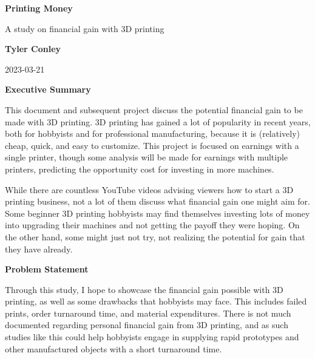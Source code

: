 \documentclass[11pt]{article}
\begin{document}
\begin{titlepage}
    \begin{center}
        \vspace*{1in}

        \Huge
        \textbf{Printing Money}

        \vspace{0.25in}
        \LARGE
        A study on financial gain with 3D printing

        \vspace{1 in}

        \textbf{Tyler Conley}

        \vspace{0.5in}
        2023-03-21

        \vfill
    \end{center}
\end{titlepage}



\begin{center}
    \LARGE
    \textbf{Executive Summary}
\end{center}

This document and subsequent project discuss the potential financial gain to be made with 3D printing. 3D printing has gained a lot of popularity in recent years, both for hobbyists
and for professional manufacturing, because it is (relatively) cheap, quick, and easy to customize. This project is focused on earnings with a single printer, though some analysis will
be made for earnings with multiple printers, predicting the opportunity cost for investing in more machines.

While there are countless YouTube videos advising viewers how to start a 3D printing business, not a lot of them discuss what financial gain one might aim for. Some beginner 3D printing
hobbyists may find themselves investing lots of money into upgrading their machines and not getting the payoff they were hoping. On the other hand, some might just not try, not realizing
the potential for gain that they have already.

\bigbreak

\textbf{Problem Statement}

Through this study, I hope to showcase the financial gain possible with 3D printing, as well as some drawbacks that hobbyists may face. This includes failed prints, order turnaround time,
and material expenditures. There is not much documented regarding personal financial gain from 3D printing, and as such studies like this could help hobbyists engage in supplying rapid prototypes and
other manufactured objects with a short turnaround time.
\end{document}

